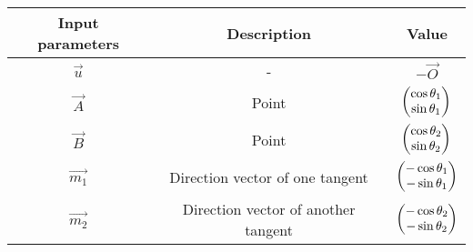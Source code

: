 \begin{tabular}{|c|c|c|}
    \hline
         \textbf{Input parameters}& \textbf{Description}&\textbf{Value} \\
         \hline
         $\vec{u}$&-&$-\vec{O}$\\
         \hline
          $\vec{A}$&Point &$\begin{pmatrix}\cos{\theta_1}\\\sin{\theta_1}\end{pmatrix}$ \\
       \hline
       $\vec{B}$&Point &$\begin{pmatrix}\cos{\theta_2}\\\sin{\theta_2}\end{pmatrix}$ \\
       \hline
          $\vec{m_1}$&Direction vector of one tangent&$\begin{pmatrix}-\cos{\theta_1}\\-\sin{\theta_1}\end{pmatrix}$\\
       \hline
       $\vec{m_2}$& Direction vector of another tangent &$\begin{pmatrix}-\cos{\theta_2}\\-\sin{\theta_2}\end{pmatrix}$ \\
       \hline
         \end{tabular}

